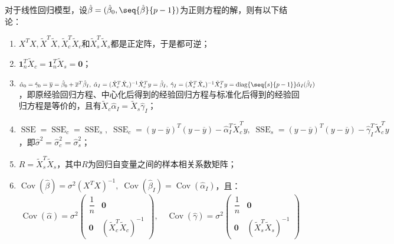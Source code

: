 \begin{theorem}\label{theo:LinearRegressionModel}
	对于线性回归模型，设$\hat{\beta}=(\hat{\beta}_0,\seq{\hat{\beta}}{p-1})$为正则方程的解，则有以下结论：
	\begin{enumerate}
		\item $X^TX,\tilde{X}^T\tilde{X},\tilde{X}_c^T\tilde{X}_c$和$\tilde{X}_s^T\tilde{X}_s$都是正定阵，于是都可逆；
		\item $\mathbf{1}_n^T\tilde{X}_c=\mathbf{1}_n^T\tilde{X}_s=\mathbf{0}$；
		\item $\hat{\alpha}_0=\hat{\gamma}_0=\overline{y}=\hat{\beta}_0+\overline{x}^T\hat{\beta}_I,\;\hat{\alpha}_I=(\tilde{X}_c^T\tilde{X}_c)^{-1}\tilde{X}_c^Ty=\hat{\beta}_I,\;\hat{\gamma}_I=(\tilde{X}_s^T\tilde{X}_s)^{-1}\tilde{X}_s^Ty=\operatorname{diag}\{\seq{s}{p-1}\}\hat{\alpha}_I(\hat{\beta}_I)$，即原经验回归方程、中心化后得到的经验回归方程与标准化后得到的经验回归方程是等价的，且有$\tilde{X}_c\hat{\alpha}_I=\tilde{X}_s\hat{\gamma}_I$；
		\item $\operatorname{SSE}=\operatorname{SSE}_c=\operatorname{SSE}_s,\;\operatorname{SSE}_c=(y-\overline{y})^T(y-\overline{y})-\hat{\alpha}_I^T\tilde{X}_c^Ty,\;\operatorname{SSE}_s=(y-\overline{y})^T(y-\overline{y})-\hat{\gamma}_I^T\tilde{X}_c^Ty$，即$\hat{\sigma}^2=\hat{\sigma}_c^2=\hat{\sigma}_s^2$；
		\item $R=\tilde{X}_s^T\tilde{X}_s$，其中$R$为回归自变量之间的样本相关系数矩阵；
		\item $\operatorname{Cov}(\hat{\beta})=\sigma^2(X^TX)^{-1},\;\operatorname{Cov}(\hat{\beta}_I)=\operatorname{Cov}(\hat{\alpha}_I)$，且：
		\begin{equation*}
			\operatorname{Cov}(\hat{\alpha})=\sigma^2
			\begin{pmatrix}
				\dfrac{1}{n} & \mathbf{0} \\
				\mathbf{0} & (\tilde{X}_c^T\tilde{X}_c)^{-1}
			\end{pmatrix},\quad
			\operatorname{Cov}(\hat{\gamma})=\sigma^2
			\begin{pmatrix}
				\dfrac{1}{n} & \mathbf{0} \\
				\mathbf{0} & (\tilde{X}_s^T\tilde{X}_s)^{-1}
			\end{pmatrix}
		\end{equation*}
	\end{enumerate}
\end{theorem}
